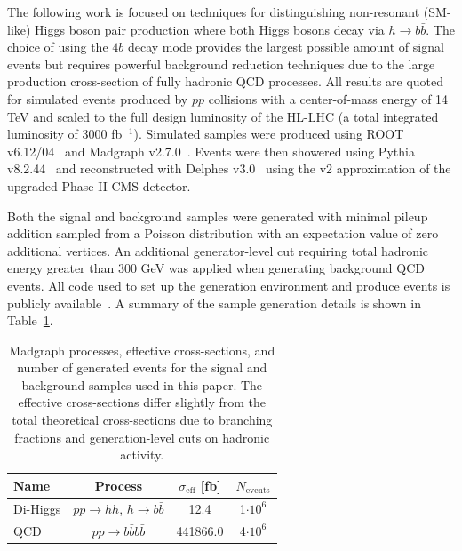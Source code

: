 The following work is focused on techniques for distinguishing non-resonant (SM-like) Higgs boson pair production where both Higgs bosons decay via $h \to b \bar{b}$. The choice of using the $4b$ decay mode provides the largest possible amount of signal events but requires powerful background reduction techniques due to the large production cross-section of fully hadronic QCD processes. All results are quoted for simulated events produced by $pp$ collisions with a center-of-mass energy of 14 TeV and scaled to the full design luminosity of the HL-LHC (a total integrated luminosity of 3000 fb$^{-1}$). Simulated samples were produced using ROOT v6.12/04~\cite{Brun:1997pa} and Madgraph v2.7.0~\cite{Alwall:2014hca}. Events were then showered using Pythia v8.2.44~\cite{Sj_strand_2015} and reconstructed with Delphes v3.0~\cite{de_Favereau_2014} using the v2 approximation of the upgraded Phase-II CMS detector.

Both the signal and background samples were generated with minimal pileup addition sampled from a Poisson distribution with an expectation value of zero additional vertices. An additional generator-level cut requiring total hadronic energy greater than 300 GeV was applied when generating background QCD events. All code used to set up the generation environment and produce events is publicly available~\cite{github}. A summary of the sample generation details is shown in Table~\ref{tab:samples}.

\begin{table}[ht!]
 \label{tab:samples}
\centering
    \begin{tabular}{|l|c|c|c|} %
      \hline\hline
      Name & Process & $\sigma_{\textrm{eff}}$ [fb] & $N_{\textrm{events}}$ \\
      \hline
      Di-Higgs & $p p \rightarrow h h$, $h \rightarrow b \bar{b}$ & 12.4 & 1$\cdot 10^6$ \\
      QCD     & $p p \rightarrow b \bar{b} b \bar{b}$ & 441866.0 & 4$\cdot 10^6$ \\
      \hline\hline
    \end{tabular}
\caption{Madgraph processes, effective cross-sections, and number of generated events for the signal and background samples used in this paper. The effective cross-sections differ slightly from the total theoretical cross-sections due to branching fractions and generation-level cuts on hadronic activity.}
\end{table}

